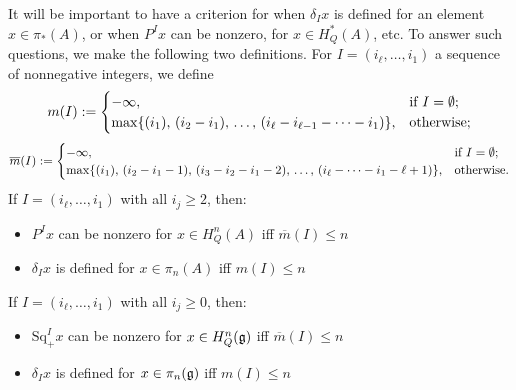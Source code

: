 \documentclass[11pt]{article}
\newcommand{\SqShift}{\Sq_{+}}
\newcommand{\Sq}{\mathrm{Sq}}
\newcommand{\minDim}{m}
\newcommand{\minDimP}{\overline{m}}
\begin{document}
\begin{SteenrodAlgebrasAndTheirKoszulDuals}
It will be important to have a criterion for when $\delta_Ix$ is defined for an element $x\in\pi_*(A)$, or when $P^Ix$ can be nonzero, for $x\in H^*_Q(A)$, etc.
To answer such questions, we make the following two definitions. For $I=(i_\ell,\ldots,i_1)$ a sequence of nonnegative integers, we define
\[\minDim(I):=\begin{cases}
-\infty,&\textup{if }I=\emptyset;\\
\max\{(i_1),\,(i_2-i_1),\,\ldots,\,(i_{\ell}-i_{\ell-1}-\cdots -i_1)\},&\textup{otherwise};
\end{cases}
\]
\[\minDimP(I):=\begin{cases}
-\infty,&\textup{if }I=\emptyset;\\
\max\{(i_1),\,(i_2-i_1-1),\,(i_3-i_2-i_1-2),\,\ldots,\,(i_{\ell}-\cdots-i_1-\ell+1)\},&\textup{otherwise}.
\end{cases}
\]
If $I=(i_{\ell},\ldots,i_1)$ with all $i_j\geq2$, then:
\begin{itemize}
\setlength{\parindent}{.25in}
\item $P^Ix$ can be nonzero for $x\in H^n_Q(A)$ iff $\minDimP(I)\leq n$
\item $\delta_Ix$ is defined for $x\in \pi_n(A)$ iff $\minDim(I)\leq n$
\end{itemize}
If $I=(i_{\ell},\ldots,i_1)$ with all $i_j\geq0$, then:
\begin{itemize}
\setlength{\parindent}{.25in}
\item $\SqShift^Ix$ can be nonzero for $x\in H^n_Q(\mathfrak{g})$ iff $\minDimP(I)\leq n$
\item $\delta_Ix$ is defined for $x\in \pi_n(\mathfrak{g})$ iff $\minDim(I)\leq n$
\end{itemize}


\end{SteenrodAlgebrasAndTheirKoszulDuals}
\end{document}
